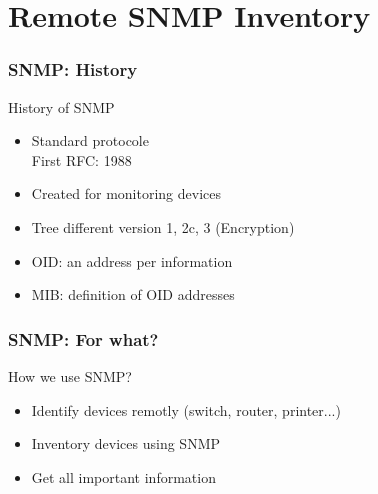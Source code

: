\documentclass{beamer}
\begin{document}
\section{Remote SNMP Inventory}
%
%


\begin{frame}
    \frametitle{SNMP: History}


    \begin{block}{History of SNMP}
    \begin{itemize}
    \item Standard protocole \\
    \small{First RFC: 1988}
    \item Created for monitoring devices
    \item Tree different version 1, 2c, 3 (Encryption)
    \item OID: an address per information
    \item MIB: definition of OID addresses
    \end{itemize}
    \end{block}
\end{frame}

\begin{frame}
    \frametitle{SNMP: For what?}

    \begin{block}{How we use SNMP?}
    \begin{itemize}
    \item Identify devices remotly (switch, router, printer...)
    \item Inventory devices using SNMP
    \item Get all important information
    \end{itemize}
    \end{block}
\end{frame}
\end{document}
